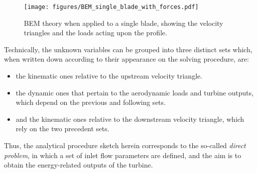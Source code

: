 \begin{figure}[h!]
	\texttt{[image: figures/BEM\_single\_blade\_with\_forces.pdf]}
	\caption{BEM theory when applied to a single blade, showing the velocity triangles and the loads acting upon the profile.}
	\label{fig:BEM_single_blade_with_forces}
\end{figure}
Technically, the unknown variables can be grouped into three distinct sets which, when written down according to their appearance on the solving procedure, are:
\begin{itemize}
	\item{the kinematic ones relative to the upstream velocity triangle.}
	\item{the dynamic ones that pertain to the aerodynamic loads and turbine outputs, which depend on the previous and following sets.}
	\item{and the kinematic ones relative to the downstream velocity triangle, which rely on the two precedent sets.}
\end{itemize}
Thus, the analytical procedure sketch herein corresponds to the so-called \emph{direct problem}, in which a set of inlet flow parameters are defined, and the aim is to obtain the energy-related outputs of the turbine.
